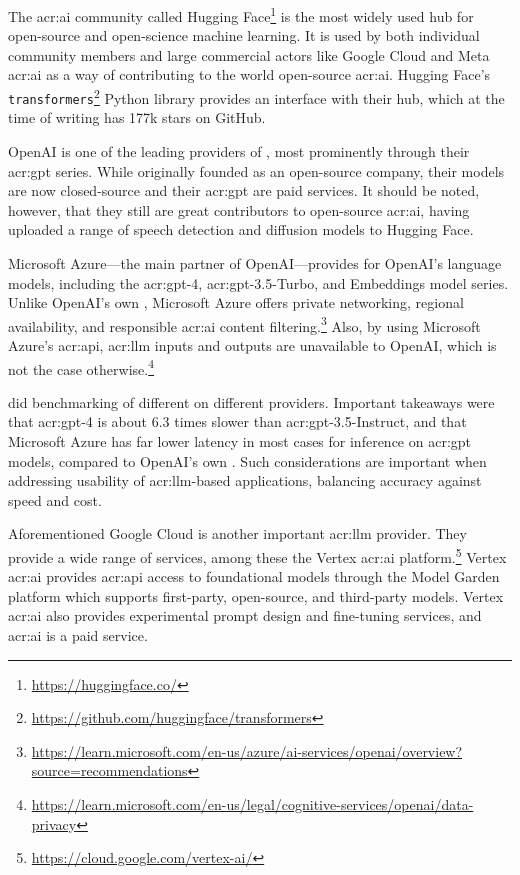 The \acrshort{acr:ai} community called Hugging Face\footnote{\url{https://huggingface.co/}} is the most widely used hub for open-source and open-science machine learning. It is used by both individual community members and large commercial actors like Google Cloud and Meta \acrshort{acr:ai} as a way of contributing to the world open-source \acrshort{acr:ai}. Hugging Face's \texttt{transformers}\footnote{\url{https://github.com/huggingface/transformers}} Python library provides an interface with their hub, which at the time of writing has 177k stars on GitHub.

OpenAI is one of the leading providers of , most prominently through their \acrshort{acr:gpt} series. While originally founded as an open-source company, their models are now closed-source and their \acrshort{acr:gpt}  are paid services. It should be noted, however, that they still are great contributors to open-source \acrshort{acr:ai}, having uploaded a range of speech detection and diffusion models to Hugging Face.

Microsoft Azure---the main partner of OpenAI---provides  for OpenAI's language models, including the \acrshort{acr:gpt}-4, \acrshort{acr:gpt}-3.5-Turbo, and Embeddings model series. Unlike OpenAI's own , Microsoft Azure offers private networking, regional availability, and responsible \acrshort{acr:ai} content filtering.\footnote{\url{https://learn.microsoft.com/en-us/azure/ai-services/openai/overview?source=recommendations}} Also, by using Microsoft Azure's \acrshort{acr:api}, \acrshort{acr:llm} inputs and outputs are unavailable to OpenAI, which is not the case otherwise.\footnote{\url{https://learn.microsoft.com/en-us/legal/cognitive-services/openai/data-privacy}}

\cite{clearyLatencyBenchmarksComparisons2023} did benchmarking of different  on different providers. Important takeaways were that \acrshort{acr:gpt}-4 is about 6.3 times slower than \acrshort{acr:gpt}-3.5-Instruct, and that Microsoft Azure has far lower latency in most cases for inference on \acrshort{acr:gpt} models, compared to OpenAI's own . Such considerations are important when addressing usability of \acrshort{acr:llm}-based applications, balancing accuracy against speed and cost.

Aforementioned Google Cloud is another important \acrshort{acr:llm} provider. They provide a wide range of services, among these the Vertex \acrshort{acr:ai} platform.\footnote{\url{https://cloud.google.com/vertex-ai/}} Vertex \acrshort{acr:ai} provides \acrshort{acr:api} access to foundational models through the Model Garden platform which supports first-party, open-source, and third-party models. Vertex \acrshort{acr:ai} also provides experimental prompt design and fine-tuning services, and \acrshort{acr:ai} is a paid service.

